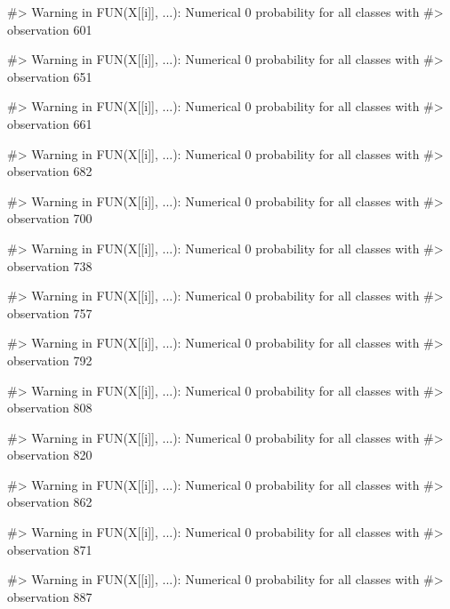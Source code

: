 \begin{Schunk}
\begin{Soutput}
#> Warning in FUN(X[[i]], ...): Numerical 0 probability for all classes with
#> observation 601
\end{Soutput}
\begin{Soutput}
#> Warning in FUN(X[[i]], ...): Numerical 0 probability for all classes with
#> observation 651
\end{Soutput}
\begin{Soutput}
#> Warning in FUN(X[[i]], ...): Numerical 0 probability for all classes with
#> observation 661
\end{Soutput}
\begin{Soutput}
#> Warning in FUN(X[[i]], ...): Numerical 0 probability for all classes with
#> observation 682
\end{Soutput}
\begin{Soutput}
#> Warning in FUN(X[[i]], ...): Numerical 0 probability for all classes with
#> observation 700
\end{Soutput}
\begin{Soutput}
#> Warning in FUN(X[[i]], ...): Numerical 0 probability for all classes with
#> observation 738
\end{Soutput}
\begin{Soutput}
#> Warning in FUN(X[[i]], ...): Numerical 0 probability for all classes with
#> observation 757
\end{Soutput}
\begin{Soutput}
#> Warning in FUN(X[[i]], ...): Numerical 0 probability for all classes with
#> observation 792
\end{Soutput}
\begin{Soutput}
#> Warning in FUN(X[[i]], ...): Numerical 0 probability for all classes with
#> observation 808
\end{Soutput}
\begin{Soutput}
#> Warning in FUN(X[[i]], ...): Numerical 0 probability for all classes with
#> observation 820
\end{Soutput}
\begin{Soutput}
#> Warning in FUN(X[[i]], ...): Numerical 0 probability for all classes with
#> observation 862
\end{Soutput}
\begin{Soutput}
#> Warning in FUN(X[[i]], ...): Numerical 0 probability for all classes with
#> observation 871
\end{Soutput}
\begin{Soutput}
#> Warning in FUN(X[[i]], ...): Numerical 0 probability for all classes with
#> observation 887
\end{Soutput}

\end{Schunk}
